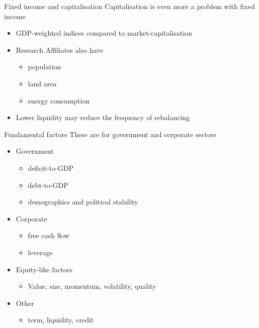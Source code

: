 \documentclass[14pt,xcolor=pdftex,dvipsnames,table]{beamer}\usepackage[]{graphicx}\usepackage[]{color}
\begin{document}
\begin{frame}{Fixed income and capitalisation}
Capitalisation is even more a problem with fixed income
\begin{itemize}[<+-| alert@+>]
\pause
\item GDP-weighted indices compared to market-capitalisation
\item Research Affiliates also have
\begin{itemize}
\item population
\item land area
\item energy consumption
\end{itemize}
\item Lower liquidity may reduce the frequency of rebalancing 
\end{itemize}
\end{frame}

\begin{frame}{Fundamental factors}
These are for government and corporate sectors
\begin{itemize}[<+-| alert@+>]
\pause
\item Government 
\begin{itemize}
\item deficit-to-GDP
\item debt-to-GDP
\item demographics and political stability
\end{itemize}
\item Corporate 
\begin{itemize}
\item free cash flow 
\item leverage
\end{itemize}
\item Equity-like factors
\begin{itemize}
\item Value, size, momentum, volatility, quality
\end{itemize}
\item Other
\begin{itemize}
\item term, liquidity, credit 
\end{itemize}  
\end{itemize}
\end{frame}
\end{document}
